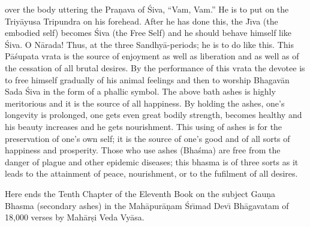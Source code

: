 over the body uttering the Pra\d{n}ava of \'Siva, ``Vam, Vam.'' He is to put on the Triy\=ayusa Tripundra on his forehead. After he has done this, the J\={\i}va (the embodied self) becomes \'Siva (the Free Self) and he should behave himself like \'Siva. O N\=arada! Thus, at the three Sandhy\=a-periods; he is to do like this. This P\=a\'supata vrata is the source of enjoyment as well as liberation and as well as of the cessation of all brutal desires. By the performance of this vrata the devotee is to free himself gradually of his animal feelings and then to worship Bhagav\=an Sada \'Siva in the form of a phallic symbol. The above bath ashes is highly meritorious and it is the source of all happiness. By holding the ashes, one's longevity is prolonged, one gets even great bodily strength, becomes healthy and his beauty increases and he gets nourishment. This using of ashes is for the preservation of one's own self; it is the source of one's good and of all sorts of happiness and prosperity. Those who use ashes (Bha\'sma) are free from the danger of plague and other epidemic diseases; this bhasma is of three sorts as it leads to the attainment of peace, nourishment, or to the fufilment of all desires.

Here ends the Tenth Chapter of the Eleventh Book on the subject Gau\d{n}a Bhasma (secondary ashes) in the Mah\=apur\=a\d{n}am \'Sr\={\i}mad Dev\={\i} Bh\=agavatam of 18,000 verses by Mah\=ar\d{s}i Veda Vy\=asa.



